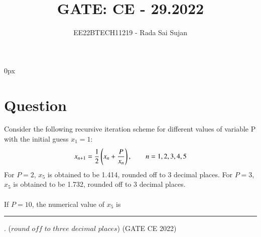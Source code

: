 \documentclass[journal,12pt,twocolumn]{IEEEtran}
\theoremstyle{remark}
\begin{document}
\parindent 0px

\title{GATE: CE - 29.2022}
\author{EE22BTECH11219 - Rada Sai Sujan$^{}$%
}
\maketitle
\newpage
\bigskip
\section*{Question}
Consider the following recursive iteration scheme for different values of variable P with the initial guess $x_1=1$:
$$x_{n+1}=\frac{1}{2}\left(x_n+\frac{P}{x_n}\right), \quad\quad n=1,2,3,4,5 $$
For $P=2$, $x_5$ is obtained to be 1.414, rounded off to 3 decimal places. For $P=3$, $x_5$ is obtained to be 1.732, rounded off to 3 decimal places.   \\ \\
If $P=10$, the numerical value of $x_5$ is \rule{1.3cm}{0.15mm} . ($round$ $off$ $to$ $three$ $decimal$ $places$)     \hfill(GATE CE 2022) \\
\solution 
\end{document}
